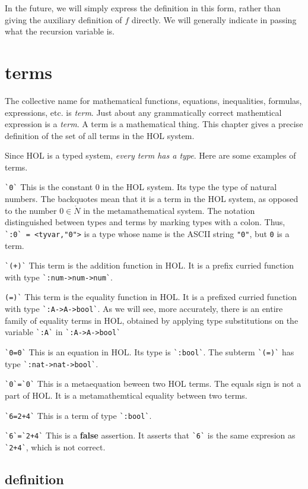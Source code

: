 \documentclass[cup9a]{cupbook}
\begin{document}
In the future, we will simply express the definition in this form, rather than giving the auxiliary definition of $f$ directly.  We will generally indicate in passing what the recursion variable is.


\chapter{terms}

The collective name for mathematical functions, equations, inequalities, formulas, expressions, etc. is {\it term}.  Just about any grammatically correct mathemtical expression is a {\it term}.  A term is a mathematical thing.  This chapter gives a precise definition of the set of all terms in the HOL system.

Since HOL is a typed system, {\it every term has a type}.
Here are some examples of terms.

\verb!`0`!  This is the constant $0$ in the HOL system.  Its type the type of natural numbers.  The backquotes mean that it is a term in the HOL system, as opposed to the number $0\in\ring{N}$ in the metamathematical system.  The notation distinguished between types and terms by marking types with a colon.  Thus, \verb!`:0` = <tyvar,"0">! is a type whose name is the ASCII string \verb!"0"!, but \verb`0` is a term.

\verb!`(+)`!  This term is the addition function in HOL.  It is a prefix curried function with type \verb!`:num->num->num`!.

\verb!(=)`!  This term is the equality function in HOL.  It is a prefixed curried function with type \verb!`:A->A->bool`!.  As we will see, more accurately, there is an entire family of equality terms in HOL, obtained by applying type substitutions on the variable \verb!`:A`! in \verb!`:A->A->bool`!

\verb!`0=0`!  This is an equation in HOL.  Its type is \verb!`:bool`!.  The subterm \verb!`(=)`! has type \verb!`:nat->nat->bool`!.

\verb!`0`=`0`!  This is a metaequation beween two HOL terms.  The equals sign is not a part of HOL.  It is a metamathemtical equality between two terms.

\verb!`6=2+4`!  This is a term of type \verb!`:bool`!.

\verb!`6`=`2+4`!  This is a {\bf false} assertion.  It asserts that \verb!`6`! is the same expresion as \verb!`2+4`!, which is not correct.  

\section{definition}
\end{document}
